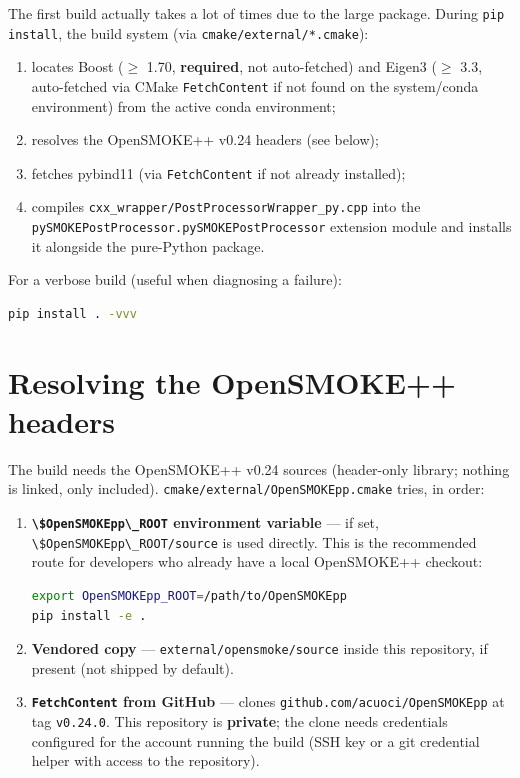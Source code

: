 \documentclass[11pt,a4paper]{report}
\newcommand{\pkg}[1]{\lstinline|#1|}
\begin{document}
The first build actually takes a lot of times due to the large package. During \pkg{pip install}, the
build system (via \pkg{cmake/external/*.cmake}):
\begin{enumerate}
\item locates Boost ($\geq$ 1.70, \textbf{required}, not auto-fetched) and
  Eigen3 ($\geq$ 3.3, auto-fetched via CMake \pkg{FetchContent} if not found
  on the system/conda environment) from the active conda environment;
\item resolves the OpenSMOKE++ v0.24 headers (see below);
\item fetches pybind11 (via \pkg{FetchContent} if not already installed);
\item compiles \texttt{cxx\_wrapper/PostProcessorWrapper\_py.cpp} into the
  \pkg{pySMOKEPostProcessor.pySMOKEPostProcessor} extension module and
  installs it alongside the pure-Python package.
\end{enumerate}

For a verbose build (useful when diagnosing a failure):
\begin{lstlisting}[language=bash]
pip install . -vvv
\end{lstlisting}

\section{Resolving the OpenSMOKE++ headers}
\label{sec:opensmoke-headers}

The build needs the OpenSMOKE++ v0.24 sources (header-only library; nothing
is linked, only included). \pkg{cmake/external/OpenSMOKEpp.cmake} tries, in
order:

\begin{enumerate}
\item \textbf{\pkg{\$OpenSMOKEpp\_ROOT} environment variable} --- if set,
  \pkg{\$OpenSMOKEpp\_ROOT/source} is used directly. This is the recommended
  route for developers who already have a local OpenSMOKE++ checkout:
\begin{lstlisting}[language=bash]
export OpenSMOKEpp_ROOT=/path/to/OpenSMOKEpp
pip install -e .
\end{lstlisting}
\item \textbf{Vendored copy} --- \pkg{external/opensmoke/source} inside this
  repository, if present (not shipped by default).
\item \textbf{\pkg{FetchContent} from GitHub} --- clones
  \pkg{github.com/acuoci/OpenSMOKEpp} at tag \pkg{v0.24.0}. This repository is
  \textbf{private}; the clone needs credentials configured for the account
  running the build (SSH key or a git credential helper with access to the repository).
\end{enumerate}
\end{document}
